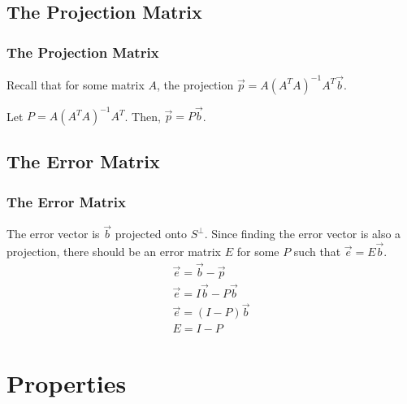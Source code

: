 \documentclass[12pt]{beamer}
\begin{document}
\subsection{The Projection Matrix}

\begin{frame}
    \frametitle{The Projection Matrix}

    Recall that for some matrix $A$, the projection $\vec{p} = A(A^T A)^{-1} A^T \vec{b}$.


    \pause

    Let $\boxed{P = A(A^T A)^{-1} A^T}$.
    Then, $\vec{p} = P \vec{b}$.

\end{frame}

\subsection{The Error Matrix}

\begin{frame}
    \frametitle{The Error Matrix}

    The error vector is $\vec{b}$ projected onto $S^\perp$.
    \pause
    Since finding the error vector is also a projection, there should be an error matrix $E$ for some $P$ such that $\vec{e} = E\vec{b}$.
    \pause
    \begin{align*}
        \vec{e} = \vec{b} - \vec{p}     \\
        \vec{e} = I \vec{b} - P \vec{b} \\
        \vec{e} = (I - P) \vec{b}       \\
        \boxed{E = I - P}
    \end{align*}
\end{frame}

\section{Properties}
\end{document}
